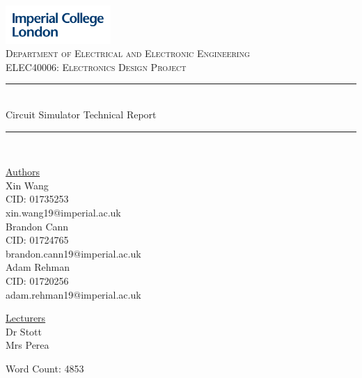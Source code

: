 \documentclass[12pt,a4paper]{article}
\begin{document}
\begin{titlepage}
	\newcommand{\HRule}{\rule{\linewidth}{0.5mm}}
    \includegraphics[width = 4cm]{./Images/Logo.jpg}\\[0.5cm] 
    
    \center 
	\textsc{\large Department of Electrical and Electronic Engineering }\\[0.5cm] 
	\textsc{\normalsize ELEC40006: Electronics Design Project}\\[0.5cm] 
    
	\HRule \\[0.4cm]
	Circuit Simulator Technical Report
    \HRule \\[1.5cm]
     
    \begin{center}
		\underline{Authors}\\[0.5cm] Xin Wang\\CID: 01735253\\xin.wang19@imperial.ac.uk\\[0.5cm]
		Brandon Cann\\ CID: 01724765\\ brandon.cann19@imperial.ac.uk\\[0.5cm]
		Adam Rehman\\ CID: 01720256\\adam.rehman19@imperial.ac.uk\\[1.5cm]
	\end{center} \large
	
    \begin{center}
		\underline{Lecturers}\\[0.5cm] Dr Stott\\Mrs Perea\\[0.5cm]
	\end{center} \large

    \vfill %
 	\small Word Count: 4853 \\ [0.5cm]
    \makeatletter
    \@date 
    \makeatother
\end{titlepage}

\tableofcontents
\pagebreak
\end{document}
